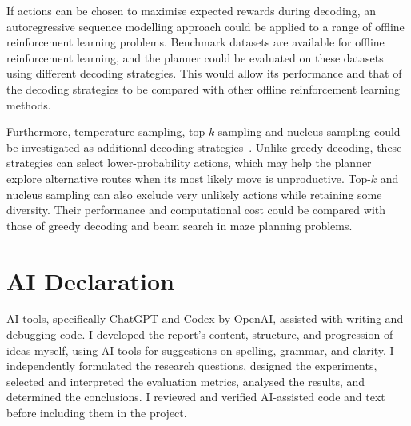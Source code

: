 ﻿\documentclass[12pt,a4paper]{article}
\let\oldcite\cite
\renewcommand{\cite}[1]{\mbox{\oldcite{#1}}}
\theoremstyle{definition}
\begin{document}
If actions can be chosen to maximise expected rewards during decoding, an autoregressive sequence modelling approach
could be applied to a range of offline reinforcement learning problems. Benchmark datasets are available for offline
reinforcement learning, and the planner could be evaluated on these datasets using different
decoding strategies. This would allow its performance and that of the decoding strategies
to be compared with other offline reinforcement learning methods.

Furthermore, temperature sampling, top-$k$ sampling and nucleus sampling could be investigated
as additional decoding strategies~\cite{holtzman2020curious}. Unlike greedy decoding, these
strategies can select lower-probability actions, which may help the planner explore alternative
routes when its most likely move is unproductive. Top-$k$ and nucleus sampling can also exclude
very unlikely actions while retaining some diversity. Their performance and computational cost
could be compared with those of greedy decoding and beam search in maze planning problems.

\section{AI Declaration}

AI tools, specifically ChatGPT and Codex by OpenAI, assisted with writing and debugging code. 
I developed the report’s content, structure, and progression of ideas myself, using AI tools for 
suggestions on spelling, grammar, and clarity. I independently formulated the research questions, 
designed the experiments, selected and interpreted the evaluation metrics, analysed the results, 
and determined the conclusions. I reviewed and verified AI-assisted code and text before including 
them in the project.
\end{document}
